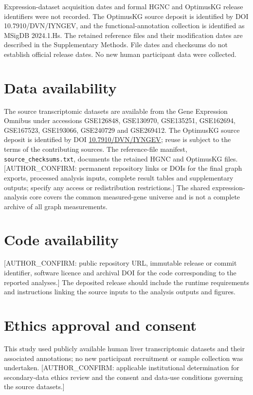 \documentclass[11pt,a4paper]{article}
\begin{document}
Expression-dataset acquisition dates and formal HGNC and OptimusKG release identifiers were not recorded. The OptimusKG source deposit is identified by DOI 10.7910/DVN/IYNGEV, and the functional-annotation collection is identified as MSigDB 2024.1.Hs. The retained reference files and their modification dates are described in the Supplementary Methods. File dates and checksums do not establish official release dates. No new human participant data were collected.




\section*{Data availability}
The source transcriptomic datasets are available from the Gene Expression Omnibus under accessions GSE126848, GSE130970, GSE135251, GSE162694, GSE167523, GSE193066, GSE240729 and GSE269412. The OptimusKG source deposit is identified by DOI \href{https://doi.org/10.7910/DVN/IYNGEV}{10.7910/DVN/IYNGEV}; reuse is subject to the terms of the contributing sources. The reference-file manifest, \nolinkurl{source_checksums.txt}, documents the retained HGNC and OptimusKG files. [AUTHOR\_CONFIRM: permanent repository links or DOIs for the final graph exports, processed analysis inputs, complete result tables and supplementary outputs; specify any access or redistribution restrictions.] The shared expression-analysis core covers the common measured-gene universe and is not a complete archive of all graph measurements.

\section*{Code availability}
[AUTHOR\_CONFIRM: public repository URL, immutable release or commit identifier, software licence and archival DOI for the code corresponding to the reported analyses.] The deposited release should include the runtime requirements and instructions linking the source inputs to the analysis outputs and figures.

\section*{Ethics approval and consent}
This study used publicly available human liver transcriptomic datasets and their associated annotations; no new participant recruitment or sample collection was undertaken. [AUTHOR\_CONFIRM: applicable institutional determination for secondary-data ethics review and the consent and data-use conditions governing the source datasets.]
\end{document}
